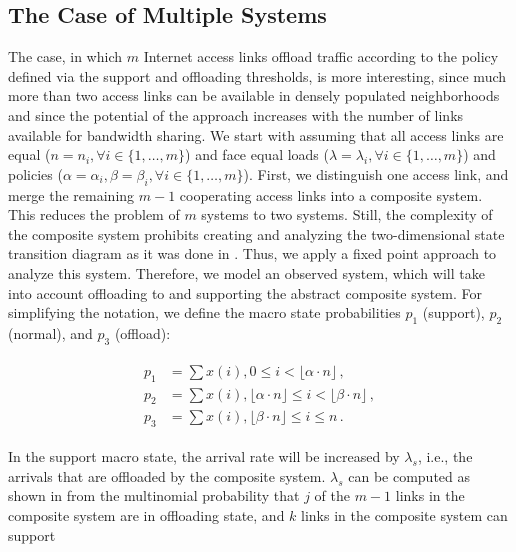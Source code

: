\subsection{The Case of Multiple Systems}\label{sec:aggregation:performance_model:analytical_model:m_systems}

The case, in which $m$ Internet access links offload traffic according to the policy defined via the support and offloading thresholds, is more interesting, since much more than two access links can be available in densely populated neighborhoods and since the potential of the approach increases with the number of links available for bandwidth sharing.
We start with assuming that all access links are equal ($n=n_i, \forall i\in\{1,\ldots,m\}$) and face equal loads ($\lambda=\lambda_i, \forall i\in\{1,\ldots,m\}$) and policies ($\alpha = \alpha_i, \beta = \beta_i, \forall i\in\{1,\ldots,m\}$). First, we distinguish one access link, and merge the remaining $m-1$ cooperating access links into a composite system. This reduces the problem of $m$ systems to two systems. Still, the complexity of the composite system prohibits creating and analyzing the two-dimensional state transition diagram as it was done in \cite{burger2016phycom}. Thus, we apply a fixed point approach to analyze this system.%
Therefore, we model an observed system, which will take into account offloading to and supporting the abstract composite system. For simplifying the notation, we define the macro state probabilities $p_1$ (support), $p_2$ (normal), and $p_3$ (offload):

\begin{align}
\begin{split}
p_1 &= \sum x(i),  0 \leq i < \lfloor\alpha\cdot n\rfloor  \, ,\\
p_2 &= \sum x(i), \lfloor\alpha\cdot n\rfloor\leq i < \lfloor\beta\cdot n\rfloor  \, ,\\
p_3 &= \sum x(i), \lfloor\beta\cdot n\rfloor \leq i \leq n \, .
\end{split}
\label{eq:macro}
\end{align}

In the support macro state, the arrival rate will be increased by $\lambda_s$, i.e., the arrivals that are offloaded by the composite system. $\lambda_s$ can be computed as shown in  from the multinomial probability that $j$ of the $m-1$ links in the composite system are in offloading state, and $k$ links in the composite system can support

